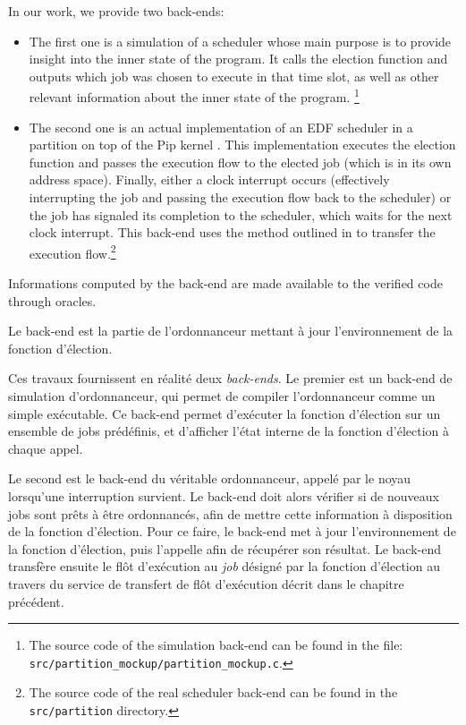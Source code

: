 		In our work, we provide two back-ends:
		\begin{itemize}
		    \item The first one  is a simulation of a scheduler whose main purpose is to provide insight into the inner state of the program. It calls the election function and outputs which job was chosen to execute in that time slot, as well as other relevant information about the inner state of the program. \footnote{The source code of the simulation back-end can be found in the file:\\ \texttt{src/partition\_mockup/partition\_mockup.c}.}
		    \item The second one is an actual implementation of an EDF scheduler in a partition on top of the Pip kernel \cite{jomaa2018proof}. This implementation executes the election function and passes the execution flow to the elected job (which is in its own address space). Finally, either a clock interrupt occurs (effectively interrupting the job and passing the execution flow back to the scheduler) or the job has signaled its completion to the scheduler, which waits for the next clock interrupt. This back-end uses the method outlined in \cite{vanhems2019proof} to transfer the execution flow.\footnote{The source code of the real scheduler back-end can be found in the \texttt{src/partition} directory.}
		\end{itemize}

		Informations computed by the back-end are made available to the verified code through oracles.

			Le back-end est la partie de l'ordonnanceur mettant à jour l'environnement de la fonction d'élection. 

			Ces travaux fournissent en réalité deux \emph{back-ends}. Le premier est un back-end de simulation d'ordonnanceur, qui permet de compiler l'ordonnanceur comme un simple exécutable. Ce back-end permet d'exécuter la fonction d'élection sur un ensemble de jobs prédéfinis, et d'afficher l'état interne de la fonction d'élection à chaque appel.

			Le second est le back-end du véritable ordonnanceur, appelé par le noyau lorsqu'une interruption survient. Le back-end doit alors vérifier si de nouveaux jobs sont prêts à être ordonnancés, afin de mettre cette information à disposition de la fonction d'élection. Pour ce faire, le back-end met à jour l'environnement de la fonction d'élection, puis l'appelle afin de récupérer son résultat. Le back-end transfère ensuite le flôt d'exécution au \emph{job} désigné par la fonction d'élection au travers du service de transfert de flôt d'exécution décrit dans le chapitre précédent.

